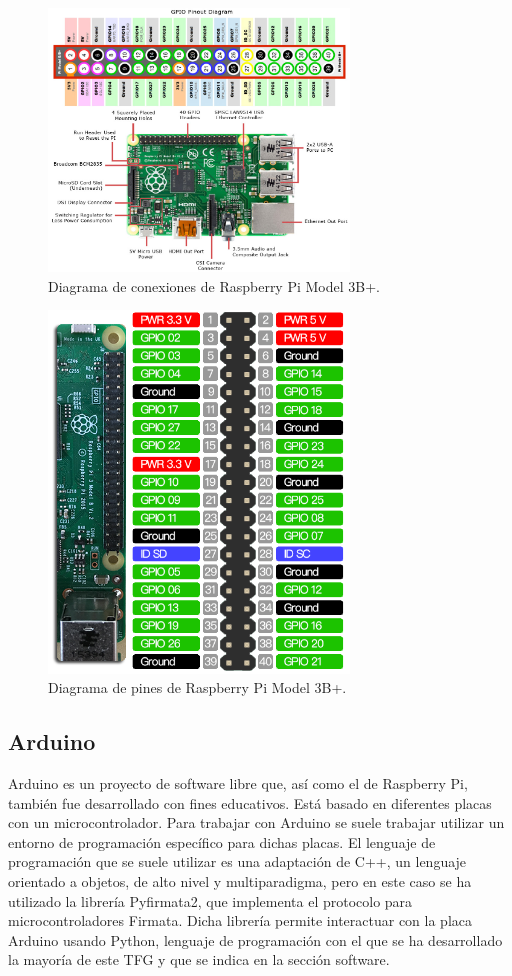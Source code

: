 \documentclass[a4paper, 12pt, oneside]{book}
\begin{document}
\begin{figure}[H]
	\centering
    \includegraphics[width=8cm, keepaspectratio]{img/conexiones_raspberry}
    \caption{Diagrama de conexiones de Raspberry Pi Model 3B+.}
    \label{figura:conexiones_raspberry}
\end{figure}


\begin{figure}[H]
	\centering
    \includegraphics[width=8cm, keepaspectratio]{img/pines_raspberry}
    \caption{Diagrama de pines de Raspberry Pi Model 3B+.}
    \label{figura:pines_raspberry}
\end{figure}

\subsection{Arduino}
\label{subsec:arduino}

Arduino es un proyecto de software libre que, así como el de Raspberry Pi, también fue desarrollado con fines educativos. Está basado en diferentes placas con un microcontrolador. Para trabajar con Arduino se suele trabajar utilizar un entorno de programación específico para dichas placas. El lenguaje de programación que se suele utilizar es una adaptación de C++, un lenguaje orientado a objetos, de alto nivel y multiparadigma, pero en este caso se ha utilizado la librería Pyfirmata2, que implementa el protocolo para microcontroladores Firmata. Dicha librería permite interactuar con la placa Arduino usando Python, lenguaje de programación con el que se ha desarrollado la mayoría de este TFG y que se indica en la sección software.
\end{document}
